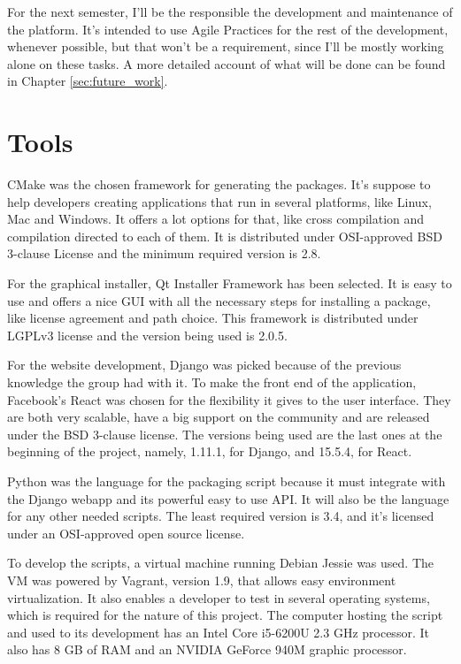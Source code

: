 For the next semester, I'll be the responsible the development and maintenance of the platform. It's intended to use Agile Practices for the rest of the development, whenever possible, but that won't be a requirement, since I'll be mostly working alone on these tasks. A more detailed account of what will be done can be found in Chapter \ref{sec:future_work}.


\section{Tools}
\label{sec:tools}

CMake was the chosen framework for generating the packages. It's suppose to help developers creating applications that run in several platforms, like Linux, Mac and Windows. It offers a lot options for that, like cross compilation and compilation directed to each of them. It is distributed under OSI-approved BSD 3-clause License and the minimum required version is 2.8.

For the graphical installer, Qt Installer Framework has been selected. It is easy to use and offers a nice GUI with all the necessary steps for installing a package, like license agreement and path choice. This framework is distributed under LGPLv3 license and the version being used is 2.0.5.

For the website development, Django was picked because of the previous knowledge the group had with it. To make the front end of the application, Facebook's React was chosen for the flexibility it gives to the user interface. They are both very scalable, have a big support on the community and are released under the BSD 3-clause license. The versions being used are the last ones at the beginning of the project, namely, 1.11.1, for Django, and 15.5.4, for React.

Python was the language for the packaging script because it must integrate with the Django webapp and its powerful easy to use API. It will also be the language for any other needed scripts. The least required version is 3.4, and it's licensed under an OSI-approved open source license.

To develop the scripts, a virtual machine running Debian Jessie was used. The VM was powered by Vagrant, version 1.9, that allows easy environment virtualization. It also enables a developer to test in several operating systems, which is required for the nature of this project. The computer hosting the script and used to its development has an Intel Core i5-6200U 2.3 GHz processor. It also has 8 GB of RAM and an NVIDIA GeForce 940M graphic processor.
